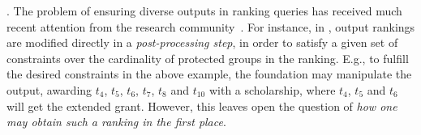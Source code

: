 .
The problem of ensuring diverse outputs in ranking queries has received much recent attention from the research community~\cite{YS17, CSV18, YGS19, AJS19, KR18, CMV20}. For instance, in \cite{YS17, CSV18, YGS19}, output rankings are modified directly in a \emph{post-processing step}, in order to satisfy a given set of constraints over the cardinality of protected groups in the ranking. E.g., to fulfill the desired constraints in the above example, the foundation may manipulate the output, awarding $t_4$, $t_5$, $t_6$, $t_7$, $t_8$ and $t_{10}$ with a scholarship, where $t_4$, $t_5$ and $t_6$ will get the extended grant. However, this leaves open the question of \emph{how one may obtain such a ranking in the first place}.



